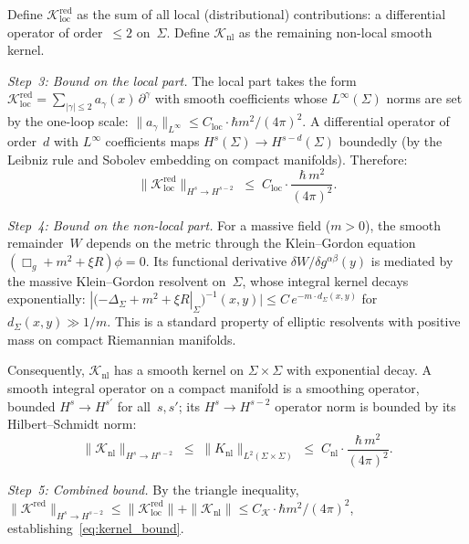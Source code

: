\documentclass[12pt,a4paper]{article}
\begin{document}
Define $\mathcal{K}^{\mathrm{red}}_{\mathrm{loc}}$ as the sum of all
local (distributional) contributions: a differential operator of
order~$\leq 2$ on~$\Sigma$. Define $\mathcal{K}_{\mathrm{nl}}$ as the
remaining non-local smooth kernel.

\smallskip\noindent\textit{Step~3: Bound on the local part.}
The local part takes the form
$\mathcal{K}^{\mathrm{red}}_{\mathrm{loc}}
= \sum_{|\gamma|\leq 2}a_\gamma(x)\,\partial^\gamma$
with smooth coefficients whose $L^\infty(\Sigma)$ norms are set by the
one-loop scale: $\|a_\gamma\|_{L^\infty} \leq C_{\mathrm{loc}}
\cdot\hbar m^2/(4\pi)^2$. A differential operator of order~$d$ with
$L^\infty$ coefficients maps $H^s(\Sigma)\to H^{s-d}(\Sigma)$
boundedly (by the Leibniz rule and Sobolev embedding on compact
manifolds). Therefore:
\begin{equation}
\bigl\|\mathcal{K}^{\mathrm{red}}_{\mathrm{loc}}\bigr\|_{H^s\to H^{s-2}}
\;\leq\; C_{\mathrm{loc}}\cdot\frac{\hbar\,m^2}{(4\pi)^2}.
\label{eq:loc_bound}
\end{equation}

\smallskip\noindent\textit{Step~4: Bound on the non-local part.}
For a massive field ($m > 0$), the smooth remainder~$W$ depends on the
metric through the Klein--Gordon equation
$(\Box_g + m^2 + \xi R)\phi = 0$. Its functional derivative
$\delta W/\delta g^{\alpha\beta}(y)$ is mediated by the massive
Klein--Gordon resolvent on~$\Sigma$, whose integral kernel decays
exponentially: $|(-\Delta_\Sigma + m^2 + \xi R|_\Sigma)^{-1}(x,y)|
\leq C\,e^{-m\cdot d_\Sigma(x,y)}$ for $d_\Sigma(x,y) \gg 1/m$. This
is a standard property of elliptic resolvents with positive mass on
compact Riemannian manifolds.

Consequently, $\mathcal{K}_{\mathrm{nl}}$ has a smooth kernel on
$\Sigma\times\Sigma$ with exponential decay. A smooth integral operator
on a compact manifold is a smoothing operator, bounded
$H^s\to H^{s'}$ for all~$s,s'$; its $H^s\to H^{s-2}$ operator norm
is bounded by its Hilbert--Schmidt norm:
\begin{equation}
\bigl\|\mathcal{K}_{\mathrm{nl}}\bigr\|_{H^s\to H^{s-2}}
\;\leq\; \|K_{\mathrm{nl}}\|_{L^2(\Sigma\times\Sigma)}
\;\leq\; C_{\mathrm{nl}}\cdot\frac{\hbar\,m^2}{(4\pi)^2}.
\label{eq:nl_bound}
\end{equation}

\smallskip\noindent\textit{Step~5: Combined bound.}
By the triangle inequality,
$\|\mathcal{K}^{\mathrm{red}}\|_{H^s\to H^{s-2}}
\leq \|\mathcal{K}^{\mathrm{red}}_{\mathrm{loc}}\|
+ \|\mathcal{K}_{\mathrm{nl}}\|
\leq C_{\mathcal{K}}\cdot\hbar m^2/(4\pi)^2$,
establishing~\eqref{eq:kernel_bound}.
\end{document}
